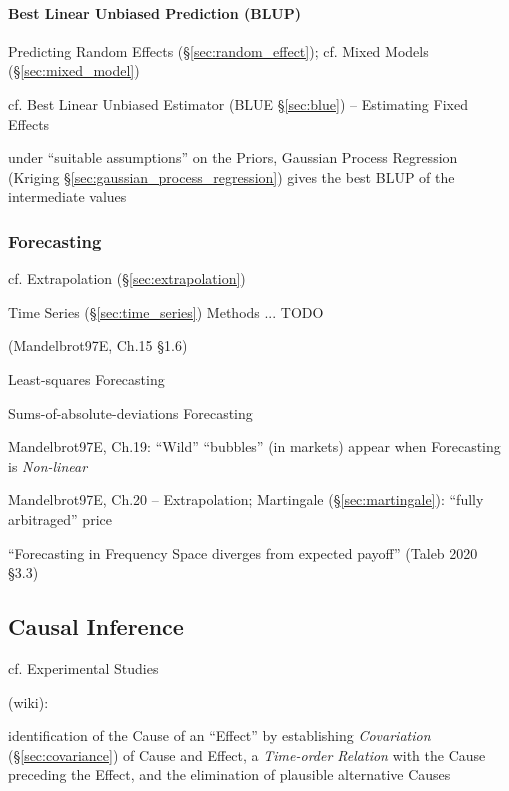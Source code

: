 \paragraph{Best Linear Unbiased Prediction (BLUP)}\label{sec:blup}\hfill

Predicting Random Effects (\S\ref{sec:random_effect});
cf. Mixed Models (\S\ref{sec:mixed_model})

cf. Best Linear Unbiased Estimator (BLUE \S\ref{sec:blue}) -- Estimating
Fixed Effects

under ``suitable assumptions'' on the Priors, Gaussian Process Regression
(Kriging \S\ref{sec:gaussian_process_regression}) gives the best BLUP of the
intermediate values



\subsubsection{Forecasting}\label{sec:forecasting}

cf. Extrapolation (\S\ref{sec:extrapolation})

Time Series (\S\ref{sec:time_series}) Methods ... TODO

(Mandelbrot97E, Ch.15 \S 1.6)

Least-squares Forecasting

Sums-of-absolute-deviations Forecasting

Mandelbrot97E, Ch.19: ``Wild'' ``bubbles'' (in markets) appear when Forecasting
is \emph{Non-linear}

Mandelbrot97E, Ch.20 -- Extrapolation; Martingale (\S\ref{sec:martingale}):
``fully arbitraged'' price

``Forecasting in Frequency Space diverges from expected payoff''
(Taleb 2020 \S 3.3)



\subsection{Causal Inference}\label{sec:causal_inference}

cf. Experimental Studies

(wiki):

identification of the Cause of an ``Effect'' by establishing \emph{Covariation}
(\S\ref{sec:covariance}) of Cause and Effect, a \emph{Time-order Relation} with
the Cause preceding the Effect, and the elimination of plausible alternative
Causes

